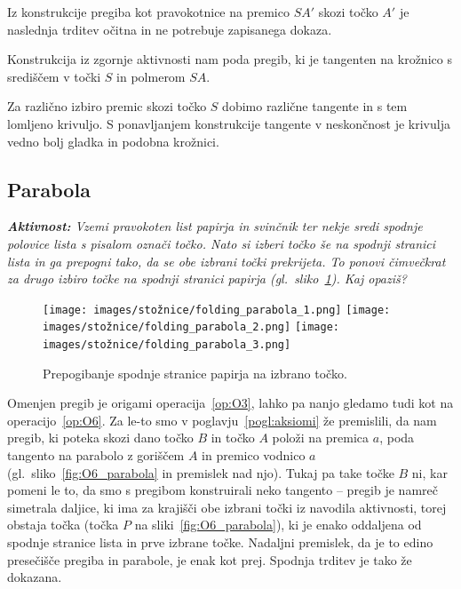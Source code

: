 
Iz konstrukcije pregiba kot pravokotnice na premico $SA'$ skozi točko $A'$ je naslednja trditev očitna in ne potrebuje zapisanega dokaza.

\begin{trditev}
    Konstrukcija iz zgornje aktivnosti nam poda pregib, ki je tangenten na krožnico s središčem v točki $S$ in polmerom $SA$.
\end{trditev}

Za različno izbiro premic skozi točko $S$ dobimo različne tangente in s tem lomljeno krivuljo. S ponavljanjem konstrukcije tangente v neskončnost je krivulja vedno bolj gladka in podobna krožnici.

\subsection{Parabola}

\textit{\textbf{Aktivnost:} Vzemi pravokoten list papirja in svinčnik ter nekje sredi spodnje polovice lista s pisalom označi točko. Nato si izberi točko še na spodnji stranici lista in ga prepogni tako, da se obe izbrani točki prekrijeta. To ponovi čimvečkrat za drugo izbiro točke na spodnji stranici papirja (gl.\ sliko~\ref{fig:koraki_parabola}). Kaj opaziš?}

\begin{figure}[h]
    \centering
    \texttt{[image: images/stožnice/folding\_parabola\_1.png]}
    \texttt{[image: images/stožnice/folding\_parabola\_2.png]}
    \texttt{[image: images/stožnice/folding\_parabola\_3.png]}
    \caption[Prepogibanje parabole]{Prepogibanje spodnje stranice papirja na izbrano točko.}
    \label{fig:koraki_parabola}
\end{figure}


Omenjen pregib je origami operacija~\ref{op:O3}, lahko pa nanjo gledamo tudi kot na operacijo~\ref{op:O6}. Za le-to smo v poglavju~\ref{pogl:aksiomi} že premislili, da nam pregib, ki poteka skozi dano točko $B$ in točko $A$ položi na premica $a$, poda tangento na parabolo z goriščem $A$ in premico vodnico $a$ (gl.\ sliko~\ref{fig:O6_parabola} in premislek nad njo). Tukaj pa take točke $B$ ni, kar pomeni le to, da smo s pregibom konstruirali neko tangento -- pregib je namreč simetrala daljice, ki ima za krajišči obe izbrani točki iz navodila aktivnosti, torej obstaja točka (točka $P$ na sliki~\ref{fig:O6_parabola}), ki je enako oddaljena od spodnje stranice lista in prve izbrane točke. Nadaljni premislek, da je to edino presečišče pregiba in parabole, je enak kot prej. Spodnja trditev je tako že dokazana.

